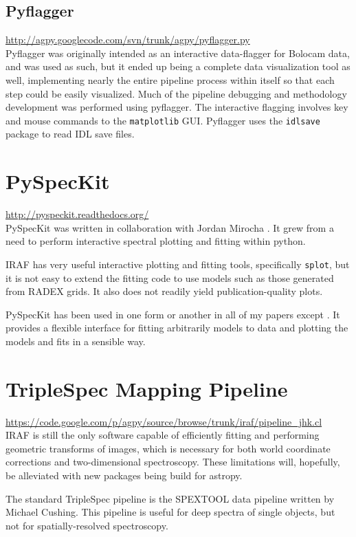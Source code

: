 \subsection{Pyflagger}
\url{http://agpy.googlecode.com/svn/trunk/agpy/pyflagger.py}\\
Pyflagger was originally intended as an interactive data-flagger for Bolocam
data, and was used as such, but it ended up being a complete data visualization
tool as well, implementing nearly the entire pipeline process within itself so
that each step could be easily visualized.  Much of the pipeline debugging and
methodology development was performed using pyflagger.  The interactive
flagging involves key and mouse commands to the \texttt{matplotlib} GUI.
Pyflagger uses the \texttt{idlsave} package to read IDL save files.

\section{PySpecKit}
\url{http://pyspeckit.readthedocs.org/} \\
PySpecKit was written in collaboration with Jordan Mirocha \citep{Ginsburg2011c}.
It grew from a need to perform interactive spectral plotting and fitting within python.

IRAF has very useful interactive plotting and fitting tools, specifically
\texttt{splot}, but it is not easy to extend the fitting code to use models
such as those generated from RADEX grids.  It also does not readily yield
publication-quality plots.

PySpecKit has been used in one form or another in all of my papers except
\citet{Ginsburg2012a}.  It provides a flexible interface for fitting
arbitrarily models to data and plotting the models and fits in a sensible way.

\section{TripleSpec Mapping Pipeline}
\url{https://code.google.com/p/agpy/source/browse/trunk/iraf/pipeline_jhk.cl} \\
IRAF is still the only software capable of efficiently fitting and performing
geometric transforms of images, which is necessary for both world coordinate
corrections and two-dimensional spectroscopy.  These limitations will, hopefully,
be alleviated with new packages being build for astropy.

The standard TripleSpec pipeline is the SPEXTOOL data pipeline written by Michael
Cushing.  This pipeline is useful for deep spectra of single objects, but not
for spatially-resolved spectroscopy.


